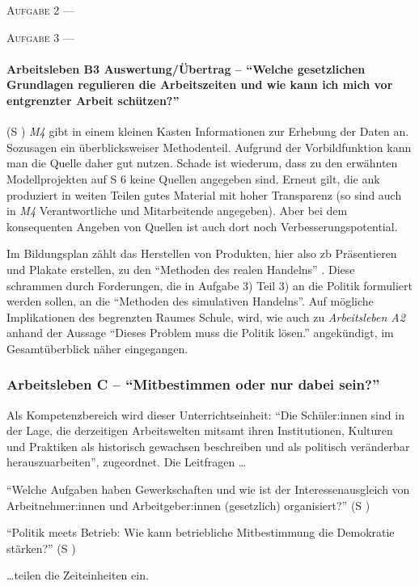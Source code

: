 \textsc{Aufgabe 2} \quad ---


\textsc{Aufgabe 3} \quad ---


\paragraph{Arbeitsleben B3 Auswertung/Übertrag -- \enquote{Welche gesetzlichen Grundlagen regulieren die Arbeitszeiten und wie kann ich mich vor entgrenzter Arbeit schützen?}} (\gls{S} \pageref{ARBEITSLEBEN-B3})
\emph{M4} gibt in einem kleinen Kasten Informationen zur Erhebung der Daten an. Sozusagen ein überblicksweiser Methodenteil. Aufgrund der Vorbildfunktion kann man die Quelle daher gut nutzen. Schade ist wiederum, dass zu den erwähnten Modellprojekten auf \gls{S} 6 keine Quellen angegeben sind. Erneut gilt, die \gls{ank} produziert in weiten Teilen gutes Material mit hoher Transparenz (so sind auch in \emph{M4} Verantwortliche und Mitarbeitende angegeben). Aber bei dem konsequenten Angeben von Quellen ist auch dort noch Verbesserungspotential. 

Im Bildungsplan zählt das Herstellen von Produkten, hier also \gls{zb} Präsentieren und Plakate erstellen, zu den \enquote{Methoden des realen Handelns} \autocite[13-14]{bplan}. Diese schrammen durch Forderungen, die in Aufgabe 3) Teil 3) an die Politik formuliert werden sollen, an die \enquote{Methoden des simulativen Handelns}. Auf mögliche Implikationen des begrenzten Raumes Schule, wird, wie auch zu \emph{Arbeitsleben A2} anhand der Aussage  \enquote{Dieses Problem muss die Politik lösen.} angekündigt, im Gesamtüberblick näher eingegangen. 



\subsubsection{Arbeitsleben C -- \enquote{Mitbestimmen oder nur dabei sein?}}
Als Kompetenzbereich wird dieser Unterrichtseinheit: 
\enquote{Die Schüler:innen sind in der Lage, die derzeitigen Arbeitswelten mitsamt ihren Institutionen, Kulturen und Praktiken als historisch gewachsen beschreiben und als politisch veränderbar herauszuarbeiten}, zugeordnet. 
Die Leitfragen \dots
\begin{myitemize}
    \item \enquote{Welche Aufgaben haben Gewerkschaften und wie ist der Interessenausgleich von Arbeitnehmer:innen und Arbeitgeber:innen (gesetzlich) organisiert?} (\gls{S} \pageref{ARBEITSLEBEN-C1})
    \item \enquote{Politik meets Betrieb: Wie kann betriebliche Mitbestimmung die Demokratie stärken?} (\gls{S} \pageref{ARBEITSLEBEN-C2})
\end{myitemize}
\dots teilen die Zeiteinheiten ein. 


